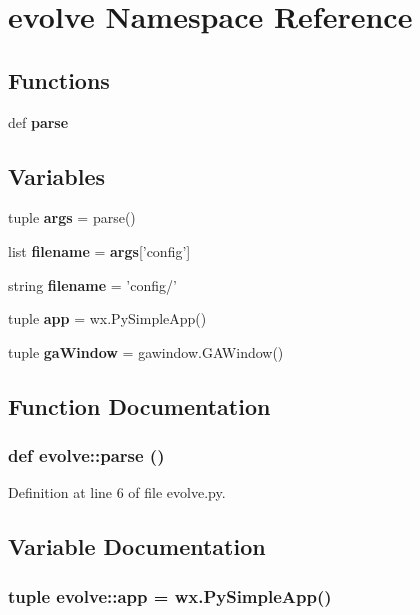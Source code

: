 \section{evolve Namespace Reference}
\label{namespaceevolve}


\subsection*{Functions}
\begin{CompactItemize}
\item 
def {\bf parse}
\end{CompactItemize}
\subsection*{Variables}
\begin{CompactItemize}
\item 
tuple {\bf args} = parse()
\item 
list {\bf filename} = {\bf args}['config']
\item 
string {\bf filename} = 'config/'
\item 
tuple {\bf app} = wx.PySimpleApp()
\item 
tuple {\bf gaWindow} = gawindow.GAWindow()
\end{CompactItemize}


\subsection{Function Documentation}
\subsubsection{\setlength{\rightskip}{0pt plus 5cm}def evolve::parse ()}\label{namespaceevolve_0b5f90a48bcf2805f833ec148823ff89}




Definition at line 6 of file evolve.py.

\subsection{Variable Documentation}
\subsubsection{\setlength{\rightskip}{0pt plus 5cm}tuple {\bf evolve::app} = wx.PySimpleApp()\hspace{0.3cm}{\tt  [static]}}\label{namespaceevolve_e0bf99d45b6707279dbc31a7d35a310d}




